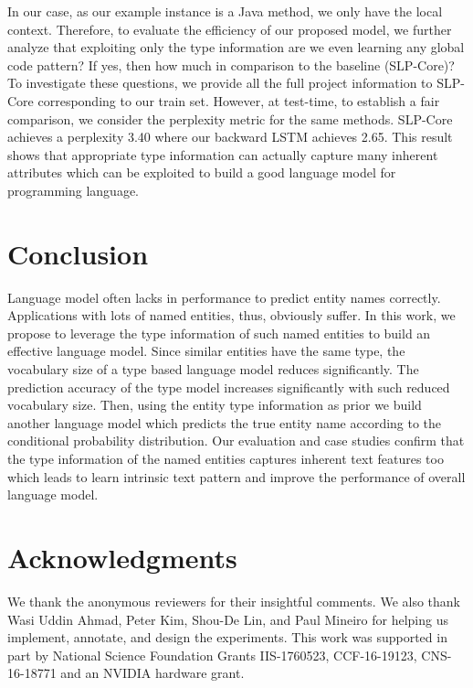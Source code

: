 \documentclass[11pt,a4paper]{article}
\begin{document}
In our case, as our example instance is a Java method, we only have the local context. Therefore, to evaluate the efficiency of our proposed model, we further analyze that exploiting only the type information are we even learning any global code pattern? If yes, then how much in comparison to the baseline (SLP-Core)?
To investigate these questions, we provide all the full project information to SLP-Core \cite{deep_net_for_source_code} corresponding to our train set. However, at test-time, to establish a fair comparison, we consider the perplexity metric for the same methods. SLP-Core achieves a perplexity 3.40  where our backward LSTM achieves 2.65. This result shows that appropriate type information can actually capture many inherent attributes which can be exploited to build a good language model for programming language.





\section{Conclusion}
\label{ssec:conclusion}
Language model often lacks in performance to predict entity names correctly. Applications with lots of named entities, thus, obviously suffer. In this work, we propose to leverage the type information of such named entities to build an effective language model. Since similar entities have the same type, the vocabulary size of a type based language model reduces significantly. The prediction accuracy of the type model increases significantly with such reduced vocabulary size. Then, using the entity type information as prior we build another language model which predicts the true entity name according to the conditional probability distribution. Our evaluation and case studies confirm that the type information of the named entities captures inherent text features too which leads to learn intrinsic text pattern and improve the performance of overall language model.



\section*{Acknowledgments}
We thank the anonymous reviewers for their insightful comments. We also thank Wasi Uddin Ahmad, Peter Kim, Shou-De Lin, and Paul Mineiro for helping us implement, annotate, and design the experiments. This work was supported in part by National Science Foundation Grants IIS-1760523, CCF-16-19123,  CNS-16-18771 and an NVIDIA hardware grant. 





\end{document}

